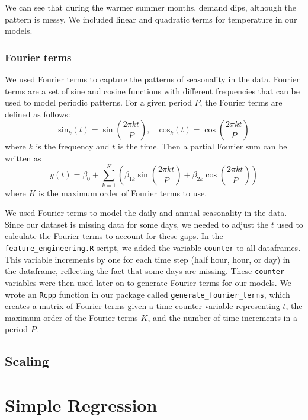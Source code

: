 \documentclass[
]{article}
\begin{document}
We can see that during the warmer summer months, demand dips, although
the pattern is messy. We included linear and quadratic terms for
temperature in our models.

\hypertarget{fourier-terms}{%
\subsubsection{Fourier terms}\label{fourier-terms}}

We used Fourier terms to capture the patterns of seasonality in the
data. Fourier terms are a set of sine and cosine functions with
different frequencies that can be used to model periodic patterns. For a
given period \(P\), the Fourier terms are defined as follows:
\[\text{sin}_k(t) = \sin\left(\frac{2\pi kt}{P}\right), \quad \text{cos}_k(t) = \cos\left(\frac{2\pi kt}{P}\right)\]
where \(k\) is the frequency and \(t\) is the time. Then a partial
Fourier sum can be written as
\[ y(t) = \beta_0 + \sum_{k=1}^{K} \left( \beta_{1k} \sin\left(\frac{2\pi kt}{P}\right) + \beta_{2k} \cos\left(\frac{2\pi kt}{P}\right) \right) \]
where \(K\) is the maximum order of Fourier terms to use.

We used Fourier terms to model the daily and annual seasonality in the
data. Since our dataset is missing data for some days, we needed to
adjust the \(t\) used to calculate the Fourier terms to account for
these gaps. In the
\href{https://github.com/Shermjj/SC-2-Electric-Boogalo/blob/main/feature_engineering.R}{\texttt{feature\_engineering.R}
script}, we added the variable \texttt{counter} to all dataframes. This
variable increments by one for each time step (half hour, hour, or day)
in the dataframe, reflecting the fact that some days are missing. These
\texttt{counter} variables were then used later on to generate Fourier
terms for our models. We wrote an \texttt{Rcpp} function in our package
called \texttt{generate\_fourier\_terms}, which creates a matrix of
Fourier terms given a time counter variable representing \(t\), the
maximum order of the Fourier terms \(K\), and the number of time
increments in a period \(P\).

\hypertarget{scaling}{%
\subsection{Scaling}\label{scaling}}

\hypertarget{simple-regression}{%
\section{Simple Regression}\label{simple-regression}}
\end{document}
